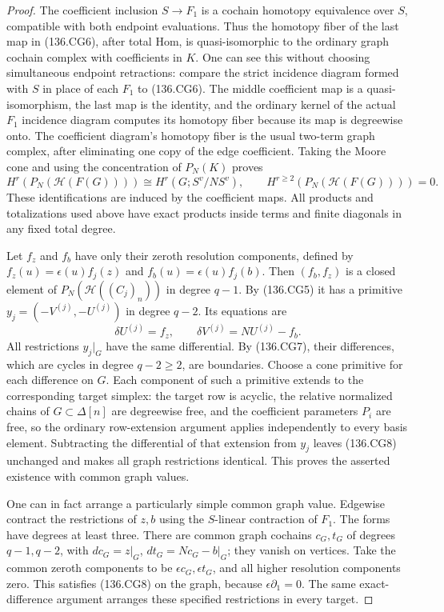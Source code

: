 \begin{proof}
The coefficient inclusion \(S\to F_1\) is a cochain
homotopy equivalence over \(S\), compatible with both
endpoint evaluations. Thus the homotopy fiber of the last
map in (136.CG6), after total Hom, is quasi-isomorphic to
the ordinary graph cochain complex with coefficients in
\(K\). One can see this without choosing simultaneous
endpoint retractions: compare the strict incidence diagram
formed with \(S\) in place of each \(F_1\) to (136.CG6).
The middle coefficient map is a quasi-isomorphism, the last
map is the identity, and the ordinary kernel of the actual
\(F_1\) incidence diagram computes its homotopy fiber because its map is
degreewise onto. The coefficient diagram's homotopy fiber
is the usual two-term graph complex, after eliminating one
copy of the edge coefficient. Taking the Moore cone and
using the concentration of \(P_N(K)\) proves
\[
 H^r(P_N(\mathcal H(F(G))))
              \cong H^r(G;S^v/NS^v),
       \qquad H^{r\geq2}(P_N(\mathcal H(F(G))))=0.
                                                               \tag{136.CG7}
\]
These identifications are induced by the coefficient maps.
All products and totalizations used above have exact products
inside terms and finite diagonals in any fixed total degree.

Let \(f_z\) and \(f_b\) have only their zeroth resolution
components, defined by
\(f_z(u)=\epsilon(u)f_j(z)\) and
\(f_b(u)=\epsilon(u)f_j(b)\). Then
\((f_b,f_z)\) is a closed element of
\(P_N(\mathcal H((C_j)_n))\) in degree \(q-1\).
By (136.CG5) it has a primitive \(y_j=(-V^{(j)},-U^{(j)})\)
in degree \(q-2\). Its equations are
\[
                       \delta U^{(j)}=f_z,\qquad
                       \delta V^{(j)}=NU^{(j)}-f_b.      \tag{136.CG8}
\]
All restrictions \(y_j|_G\) have the same differential.
By (136.CG7), their differences, which are cycles in degree
\(q-2\geq2\), are boundaries. Choose a cone primitive
for each difference on \(G\). Each component of such a
primitive extends to the corresponding target simplex:
the target row is acyclic, the relative normalized chains of
\(G\subset\Delta[n]\) are degreewise free, and the
coefficient parameters \(P_i\) are free, so the ordinary
row-extension argument applies independently to every basis
element. Subtracting the differential of that extension from
\(y_j\) leaves (136.CG8) unchanged and makes all graph
restrictions identical. This proves the asserted existence
with common graph values.

One can in fact arrange a particularly simple common graph
value. Edgewise contract the restrictions of \(z,b\) using
the \(S\)-linear contraction of \(F_1\). The forms have
degrees at least three. There are common graph cochains
\(c_G,t_G\) of degrees \(q-1,q-2\), with
\(dc_G=z|_G\), \(dt_G=Nc_G-b|_G\); they vanish on vertices.
Take the common zeroth components to be
\(\epsilon c_G,\epsilon t_G\), and all higher resolution
components zero. This satisfies (136.CG8) on the graph,
because \(\epsilon\partial_1=0\). The same exact-difference
argument arranges these specified restrictions in every target.


\end{proof}
